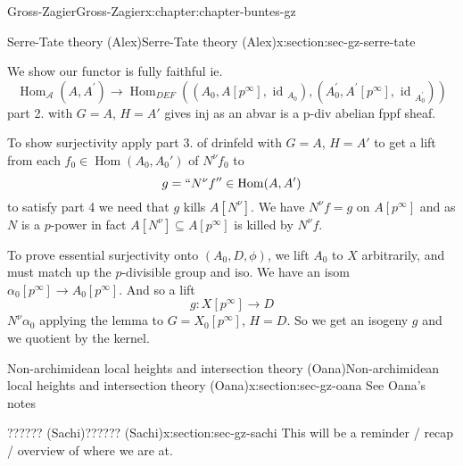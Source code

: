 \documentclass[oneside,10pt,]{book}
\numberwithin{equation}{section}
\newcommand{\lb}{[}
\newcommand{\rb}{]}
\DeclareMathOperator{\Hom}{Hom}
\begin{document}
\begin{chapterptx}{Gross-Zagier}{}{Gross-Zagier}{}{}{x:chapter:chapter-buntes-gz}
\begin{sectionptx}{Serre-Tate theory (Alex)}{}{Serre-Tate theory (Alex)}{}{}{x:section:sec-gz-serre-tate}
\par
We show our functor is fully faithful ie.%
\begin{equation*}
\operatorname{Hom}_{\mathcal{A}}\left(A, A^{\prime}\right) \rightarrow \operatorname{Hom}_{D E F}\left(\left(A_{0}, A\left[p^{\infty}\right], \text { id }_{A_{0}}\right),\left(A_{0}^{\prime}, A^{\prime}\left[p^{\infty}\right], \text { id }_{A_{0}^{\prime}}\right)\right)
\end{equation*}
part 2. with \(G =A\), \(H = A'\) gives inj as an abvar is a p-div abelian fppf sheaf.%
\par
To show surjectivity apply part 3. of drinfeld with \(G = A\), \(H = A'\) to get a lift from each \(f_0\in \Hom(A_0, A_0')\) of \(N^\nu  f_0\) to%
\begin{equation*}
g = `` N^\nu f'' \in \Hom(A, A')
\end{equation*}
to satisfy part 4 we need that \(g\) kills \(A\lb N^\nu \rb \). We have \(N^\nu  f = g\) on \(A\lb p^\infty \rb \) and as  \(N\) is a \(p\)-power in fact \(A \lb  N^\nu \rb  \subseteq A\lb  p^\infty \rb \) is killed by \(N^\nu f\).%
\par
To prove essential surjectivity onto \((A_0, D, \phi )\), we lift \(A_0\) to \(X\) arbitrarily, and must match up the \(p\)-divisible group and iso. We have an isom \(\alpha _0 \lb p^\infty \rb  \to A_0 \lb p^\infty \rb \). And so a lift%
\begin{equation*}
g\colon  X[p^\infty ] \to D
\end{equation*}
\(N^\nu \alpha _0\) applying the lemma to \(G = X_0\lb p^\infty \rb \), \(H = D\). So we get an isogeny \(g\) and we quotient by the kernel.%
\end{sectionptx}
%
%
\typeout{************************************************}
\typeout{************************************************}
%
\begin{sectionptx}{Non-archimidean local heights and intersection theory (Oana)}{}{Non-archimidean local heights and intersection theory (Oana)}{}{}{x:section:sec-gz-oana}
See Oana's notes%
\end{sectionptx}
%
%
\typeout{************************************************}
\typeout{************************************************}
%
\begin{sectionptx}{?????? (Sachi)}{}{?????? (Sachi)}{}{}{x:section:sec-gz-sachi}
This will be a reminder \slash{} recap \slash{} overview of where we are at.%

\end{sectionptx}
\end{chapterptx}
\end{document}
